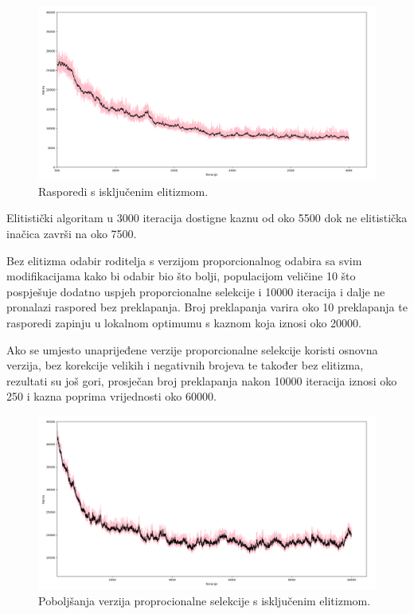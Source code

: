 \documentclass[times, utf8, zavrsni]{fer}
\begin{document}
\begin{figure}[htb]
\centering
\includegraphics[width=14cm]{images/usp_elitizam_ne.png}
\caption{Rasporedi s isključenim elitizmom.}
\label{fig:usp_elitizam_ne}
\end{figure}

Elitistički algoritam u 3000 iteracija dostigne kaznu od oko 5500 dok ne elitistička inačica završi na oko 7500.

Bez elitizma odabir roditelja s verzijom proporcionalnog odabira sa svim modifikacijama  kako bi odabir bio što bolji, populacijom veličine 10 što pospješuje dodatno uspjeh proporcionalne selekcije i 10000 iteracija i dalje ne pronalazi raspored bez preklapanja. Broj preklapanja varira oko 10 preklapanja te rasporedi zapinju u lokalnom optimumu s kaznom koja iznosi oko 20000.

Ako se umjesto unaprijeđene verzije proporcionalne selekcije koristi osnovna verzija, bez korekcije velikih i negativnih brojeva te također bez elitizma, rezultati su još gori, prosječan broj preklapanja nakon 10000 iteracija iznosi oko 250 i kazna poprima vrijednosti oko 60000.

\begin{figure}[htb]
\centering
\includegraphics[width=14cm]{images/proporcije_e_ne.png}
\caption{Poboljšanja verzija proprocionalne selekcije s isključenim elitizmom.}
\label{fig:prop_e_ne}
\end{figure}
\end{document}

